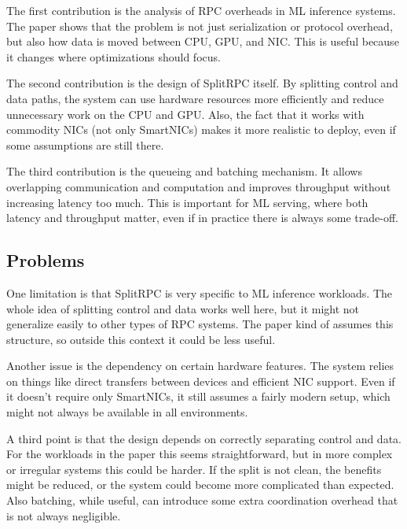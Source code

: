 \documentclass[a4paper, 12pt]{article}
\begin{document}
The first contribution is the analysis of RPC overheads in ML inference systems. The paper shows that the problem is not just serialization or protocol overhead, but also how data is moved between CPU, GPU, and NIC. This is useful because it changes where optimizations should focus.

The second contribution is the design of SplitRPC itself. By splitting control and data paths, the system can use hardware resources more efficiently and reduce unnecessary work on the CPU and GPU. Also, the fact that it works with commodity NICs (not only SmartNICs) makes it more realistic to deploy, even if some assumptions are still there.

The third contribution is the queueing and batching mechanism. It allows overlapping communication and computation and improves throughput without increasing latency too much. This is important for ML serving, where both latency and throughput matter, even if in practice there is always some trade-off.

\subsection{Problems}

One limitation is that SplitRPC is very specific to ML inference workloads. The whole idea of splitting control and data works well here, but it might not generalize easily to other types of RPC systems. The paper kind of assumes this structure, so outside this context it could be less useful.

Another issue is the dependency on certain hardware features. The system relies on things like direct transfers between devices and efficient NIC support. Even if it doesn’t require only SmartNICs, it still assumes a fairly modern setup, which might not always be available in all environments.

A third point is that the design depends on correctly separating control and data. For the workloads in the paper this seems straightforward, but in more complex or irregular systems this could be harder. If the split is not clean, the benefits might be reduced, or the system could become more complicated than expected. Also batching, while useful, can introduce some extra coordination overhead that is not always negligible.
\end{document}
